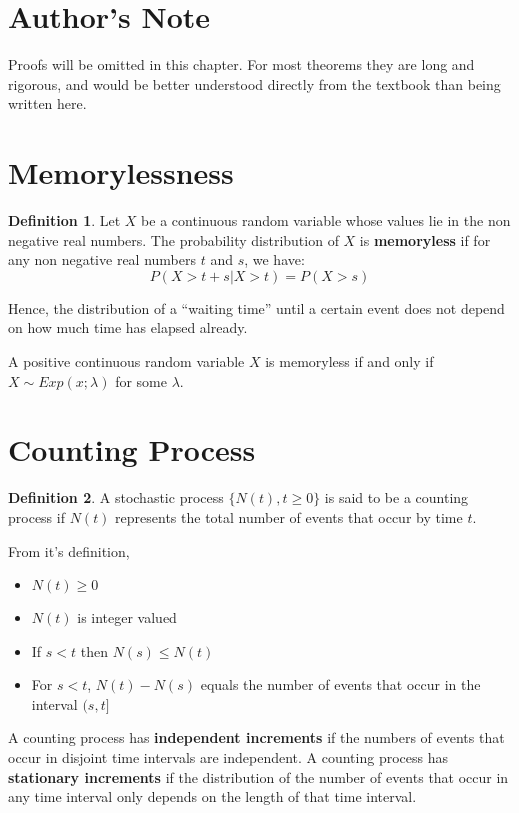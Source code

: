 \documentclass[12pt,letterpaper]{book}
\theoremstyle{definition}
\newtheorem{definition}{Definition}%
\begin{document}
\section{Author's Note}

Proofs will be omitted in this chapter. For most theorems they are long and rigorous, and would be better understood directly from the textbook than being written here.

\section{Memorylessness}

\begin{definition}
Let $X$ be a continuous random variable whose values lie in the non negative real numbers. The probability distribution of $X$ is \textbf{memoryless} if for any non negative real numbers $t$ and $s$, we have:
\[P(X>t + s | X > t) = P(X>s)\]
\end{definition}

Hence, the distribution of a ``waiting time'' until a certain event does not depend on how much time has elapsed already.

\begin{theorem}
  A positive continuous random variable $X$ is memoryless if and only if $X \sim Exp(x;\lambda)$ for some $\lambda$.
\end{theorem}

\section{Counting Process}

\begin{definition}
A stochastic process $\{N(t),t \geq 0\}$ is said to be a counting process if $N(t)$ represents the total number of events that occur by time $t$.  
\end{definition}

From it's definition, 
\begin{itemize}
  \item $N(t) \geq 0$
  \item $N(t)$ is integer valued
  \item If $s < t$ then $N(s) \leq N(t)$
  \item For $s < t$, $N(t)-N(s)$ equals the number of events that occur in the interval $(s,t]$
\end{itemize}

A counting process has \textbf{independent increments}  if the numbers of events that occur in disjoint time intervals are independent. A counting process has \textbf{stationary increments} if the distribution of the number of events that occur in any time interval only depends on the length of that time interval.
\end{document}
